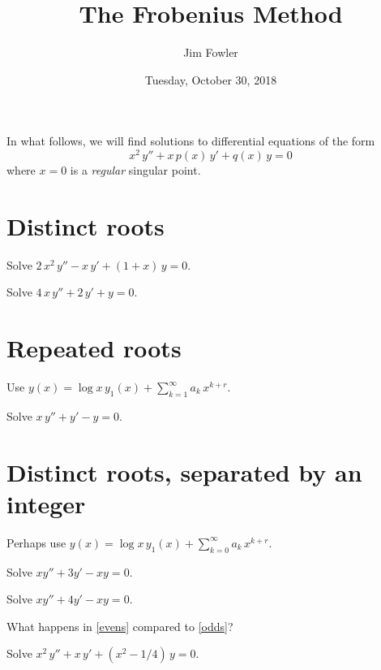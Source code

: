 \documentclass{homework}
\author{Jim Fowler}
\title{The Frobenius Method}
\date{Tuesday, October 30, 2018}
\begin{document}
\maketitle

\newenvironment{truefalse}{\begin{problem}}{\hfill \textsf{True\quad False}\end{problem}}

In what follows, we will find solutions to differential equations of the form
\[
  x^2 \, y'' + x \, p(x) \, y' + q(x) \, y = 0
\]
where $x = 0$ is a \textit{regular} singular point.

\section{Distinct roots}

\begin{problem}
  Solve $2 \, x^2 \, y'' - x\, y' + (1+x) \, y = 0$.
\end{problem}

\vfill


\begin{problem}
  Solve $4\, x\, y'' + 2 \, y' + y = 0$.
\end{problem}

\vfill


\section{Repeated roots}

Use $y(x) = \log x \, y_1(x) + \sum_{k=1}^\infty a_k \, x^{k+r}$.

\begin{problem}
  Solve $x \, y'' + y' - y = 0$.
\end{problem}

\vfill


\section{Distinct roots, separated by an integer}

Perhaps use $y(x) = \log x \, y_1(x) + \sum_{k=0}^\infty a_k \, x^{k+r}$.


\begin{problem}\label{evens}
  Solve $x y'' + 3 y' - xy = 0$.
\end{problem}

\vfill


\begin{problem}\label{odds}
  Solve $x y'' + 4 y' - xy = 0$.
\end{problem}

\vfill


\begin{problem}
  What happens in \ref{evens} compared to \ref{odds}?
\end{problem}

\vfill


\begin{problem}
  Solve $x^2 \, y'' + x \, y' + \left( x^2 - 1/4 \right) \, y = 0 $.
\end{problem}

\vfill
\end{document}
